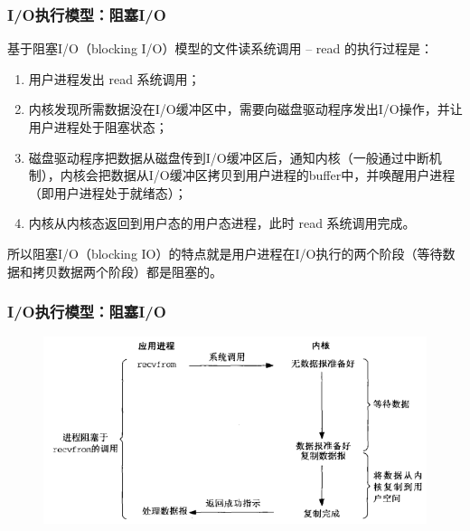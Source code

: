 \begin{frame}[fragile]
    \frametitle{I/O执行模型：阻塞I/O}
    基于阻塞I/O（blocking I/O）模型的文件读系统调用 – read 的执行过程是：
    \begin{enumerate}

        \item 用户进程发出 read 系统调用；
        \item 内核发现所需数据没在I/O缓冲区中，需要向磁盘驱动程序发出I/O操作，并让用户进程处于阻塞状态；
        \item 磁盘驱动程序把数据从磁盘传到I/O缓冲区后，通知内核（一般通过中断机制），内核会把数据从I/O缓冲区拷贝到用户进程的buffer中，并唤醒用户进程（即用户进程处于就绪态）；
        \item 内核从内核态返回到用户态的用户态进程，此时 read 系统调用完成。
    \end{enumerate}       

    所以阻塞I/O（blocking IO）的特点就是用户进程在I/O执行的两个阶段（等待数据和拷贝数据两个阶段）都是阻塞的。
    
\end{frame}
\begin{frame}[fragile]
    \frametitle{I/O执行模型：阻塞I/O}
    \begin{figure}
        \includegraphics[width=0.85\linewidth]{figs/block-io.png}
    \end{figure}
\end{frame}

